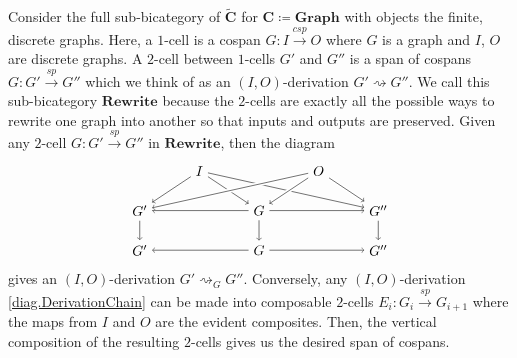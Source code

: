 \documentclass{tac}
\newcommand{\cat}[1]{\mathbf{#1}}
\newcommand{\from}{\colon}
\renewcommand{\span}{\xrightarrow{\mathit{sp}}}
\newcommand{\cospan}{\xrightarrow{\mathit{csp}}}
\newcommand{\csC}{\widetilde{\mathbf{C}}}
\begin{document}
Consider the full sub-bicategory of $\csC$ for 
	$\cat{C} \coloneqq \cat{Graph}$ 
with objects the finite, discrete graphs. 
Here, a $1$-cell is a cospan 
	$ G \from I \cospan O $ 
where $G$ is a graph and $I$, $O$ are discrete graphs.  
A $2$-cell between $1$-cells $G'$ and $G''$ is a span of cospans 
	$ G \from G' \span G'' $ 
which we think of as an $(I,O)$-derivation 
	$ G' \rightsquigarrow G'' $.  
We call this sub-bicategory $\cat{Rewrite}$ 
because the $2$-cells are exactly all the possible ways 
to rewrite one graph into another so that inputs and outputs are preserved. 
Given any $2$-cell 
	$ G \from G' \span G'' $ 
in $\cat{Rewrite}$, then the diagram 
\[
	\begin{tikzpicture}
	\node (I) at (1.5,2) {$I$};
	\node (O) at (4.5,2) {$O$};
	\node (L) at (0,1) {$G'$};
	\node (K) at (3,1) {$G$};
	\node (R) at (6,1) {$G''$};
	\node (G) at (0,0) {$G'$};
	\node (E) at (3,0) {$G$};
	\node (G') at (6,0) {$G''$};
	\draw [->] (I) edge (L);
	\draw [->] (I) edge (K);
	\draw [->] (I) edge (R);
	\draw [->] (K) edge (L);
	\draw [->] (K) edge (E);
	\draw [->] (K) edge (R);
	\draw [->] (L) edge (G);
	\draw [->] (R) edge (G');
	\draw [->] (E) edge (G);
	\draw [->] (E) edge (G');
	\draw [-] (O) edge[white,line width=3pt] (L);
	\draw [->] (O) edge (L);
	\draw [-] (O) edge[white,line width=3pt] (K);
	\draw [->] (O) edge (K);
	\draw [-] (O) edge[white,line width=3pt] (R);
	\draw [->] (O) edge (R);
	\end{tikzpicture}
\]
gives an $(I,O)$-derivation 
	$ G' \rightsquigarrow_G G'' $. 
Conversely, any $(I,O)$-derivation 
	\eqref{diag.DerivationChain} 
can be made into composable $2$-cells 
	$ E_i \from G_i \span G_{ i + 1 }$ 
where the maps from $I$ and $O$ are the evident composites. 
Then, the vertical composition of the resulting $2$-cells 
gives us the desired span of cospans.
\end{document}
